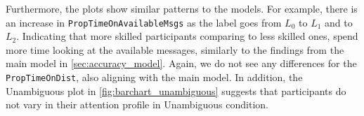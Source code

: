 Furthermore, the plots show similar patterns to the models. For example, there is an increase in \texttt{PropTimeOnAvailableMsgs} as the label goes from $L_0$ to $L_1$ and to $L_2$. Indicating that more skilled participants comparing to less skilled ones, spend more time looking at the available messages, similarly to the findings from the main model in \autoref{sec:accuracy_model}. Again, we do not see any differences for the \texttt{PropTimeOnDist}, also aligning with the main model. In addition, the Unambiguous plot in \autoref{fig:barchart_unambiguous} suggests that participants do not vary in their attention profile in Unambiguous condition.

\begin{figure}
\centering
\begin{floatrow}
\end{floatrow}
\end{figure}
